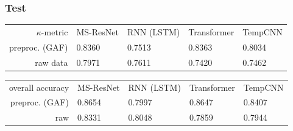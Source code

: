 \documentclass[%
  aspectratio=169,
  9pt,
ngerman,
  light,
  mathserif,
  professionalfont,
  affiliationintitlepagehead,
  titlegraphic,
   affiliation,
   navigationbar,
  progressbar,
]{beamer}
\begin{document}
\begin{frame}
	\frametitle{Test}
	
	\begin{tabular}{rllll}
		\toprule
		$\kappa$-metric & MS-ResNet & RNN (LSTM) & Transformer & TempCNN \\
		\cmidrule(lr){2-2}\cmidrule(lr){3-3}\cmidrule(lr){4-4}\cmidrule(lr){5-5}
		preproc. (GAF) & 0.8360 & 0.7513 & 0.8363 & 0.8034 \\
		raw data & 0.7971 & 0.7611 & 0.7420 & 0.7462 \\
		\bottomrule
	\end{tabular}
	
	\begin{tabular}{rllll}
		\toprule
		overall accuracy & MS-ResNet & RNN (LSTM) & Transformer & TempCNN \\
		\cmidrule(lr){2-2}\cmidrule(lr){3-3}\cmidrule(lr){4-4}\cmidrule(lr){5-5}
		preproc. (GAF) & 0.8654 & 0.7997 & 0.8647 & 0.8407 \\
		raw & 0.8331 & 0.8048 & 0.7859 & 0.7944 \\
		\bottomrule
	\end{tabular}
	
	
	
	
\end{frame}

%
\end{document}
